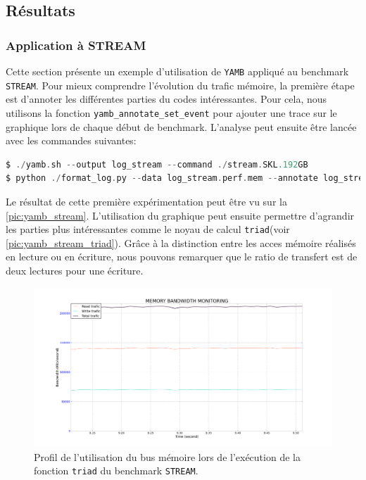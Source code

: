 \subsection{Résultats}


    \subsubsection{Application à STREAM}

        Cette section présente un exemple d'utilisation de \verb=YAMB= appliqué au benchmark \verb=STREAM=. Pour mieux comprendre l'évolution du trafic mémoire, la première étape est d'annoter les différentes parties du codes intéressantes. Pour cela, nous utilisons la fonction \verb=yamb_annotate_set_event= pour ajouter une trace sur le graphique lors de chaque début de benchmark. L'analyse peut ensuite être lancée avec les commandes suivantes:
    
\begin{lstlisting}[label=lst:yamb_api ,language=C]
$ ./yamb.sh --output log_stream --command ./stream.SKL.192GB
$ python ./format_log.py --data log_stream.perf.mem --annotate log_stream.annotate
\end{lstlisting}

        Le résultat de cette première expérimentation peut être vu sur la \autoref{pic:yamb_stream}. L'utilisation du graphique peut ensuite permettre d'agrandir les parties plus intéressantes comme le noyau de calcul \verb=triad=(voir \autoref{pic:yamb_stream_triad}). Grâce à la distinction entre les acces mémoire réalisés en lecture ou en écriture, nous pouvons remarquer que le ratio de transfert est de deux lectures pour une écriture.
        
        
        \begin{figure}
        \center
        \includegraphics[width=14cm]{images/yamb_stream_triad.png}
        \caption{\label{pic:yamb_stream_triad} Profil de l'utilisation du bus mémoire lors de l'exécution de la fonction \texttt{triad} du benchmark \texttt{STREAM}.}
        \end{figure}


